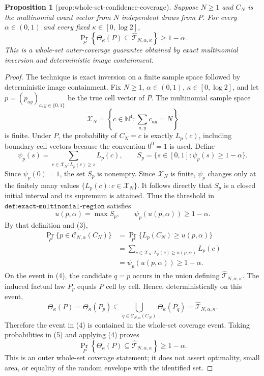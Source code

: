 \documentclass{article}
\newtheorem{proposition}{Proposition}
\begin{document}
\begin{proposition}[prop:whole-set-confidence-coverage]\label{prop:whole-set-confidence-coverage}
Suppose \(N\geq1\) and \(C_N\) is the multinomial count vector from \(N\) independent draws from \(P\). For every \(\alpha\in(0,1)\) and every fixed \(\kappa\in[0,\log2]\), \[\Pr_P\left\{\Theta_\kappa(P)\subseteq\widehat{\mathcal T}_{N,\alpha,\kappa}\right\}\geq1-\alpha.\] This is a whole-set outer-coverage guarantee obtained by exact multinomial inversion and deterministic image containment.
\end{proposition}
\begin{proof}
The technique is exact inversion on a finite sample space followed by deterministic image containment.  Fix \(N\geq1\), \(\alpha\in(0,1)\), \(\kappa\in[0,\log2]\), and let \(p=(p_{ay})_{a,y\in\{0,1\}}\) be the true cell vector of \(P\).  The multinomial sample space
\[
\mathscr X_N=\left\{c\in\mathbb N^4:\sum_{a,y}c_{ay}=N\right\}
\tag{1}
\]
is finite.  Under \(P\), the probability of \(C_N=c\) is exactly \(L_p(c)\), including boundary cell vectors because the convention \(0^0=1\) is used.  Define
\[
\psi_p(s)=\sum_{c\in\mathscr X_N:L_p(c)\geq s}L_p(c),
\qquad
S_p=\{s\in[0,1]:\psi_p(s)\geq1-\alpha\}.
\tag{2}
\]
Since \(\psi_p(0)=1\), the set \(S_p\) is nonempty.  Since \(\mathscr X_N\) is finite, \(\psi_p\) changes only at the finitely many values \(\{L_p(c):c\in\mathscr X_N\}\).  It follows directly that \(S_p\) is a closed initial interval and its supremum is attained.  Thus the threshold in \(\texttt{def:exact-multinomial-region}\) satisfies
\[
u(p,\alpha)=\max S_p,\qquad
\psi_p(u(p,\alpha))\geq1-\alpha.
\tag{3}
\]
By that definition and (3),
\[
\begin{aligned}
\Pr_P\{p\in\mathcal C_{N,\alpha}(C_N)\}
&=\Pr_P\{L_p(C_N)\geq u(p,\alpha)\}\\
&=\sum_{c\in\mathscr X_N:L_p(c)\geq u(p,\alpha)}L_p(c)\\
&=\psi_p(u(p,\alpha))\geq1-\alpha.
\end{aligned}
\tag{4}
\]
On the event in (4), the candidate \(q=p\) occurs in the union defining \(\widehat{\mathcal T}_{N,\alpha,\kappa}\).  The induced factual law \(P_p\) equals \(P\) cell by cell.  Hence, deterministically on this event,
\[
\Theta_\kappa(P)=\Theta_\kappa(P_p)
\subseteq\bigcup_{q\in\mathcal C_{N,\alpha}(C_N)}\Theta_\kappa(P_q)
=\widehat{\mathcal T}_{N,\alpha,\kappa}.
\tag{5}
\]
Therefore the event in (4) is contained in the whole-set coverage event.  Taking probabilities in (5) and applying (4) proves
\[
\Pr_P\left\{\Theta_\kappa(P)\subseteq\widehat{\mathcal T}_{N,\alpha,\kappa}\right\}\geq1-\alpha.
\]
This is an outer whole-set coverage statement; it does not assert optimality, small area, or equality of the random envelope with the identified set.
\end{proof}
\end{document}
